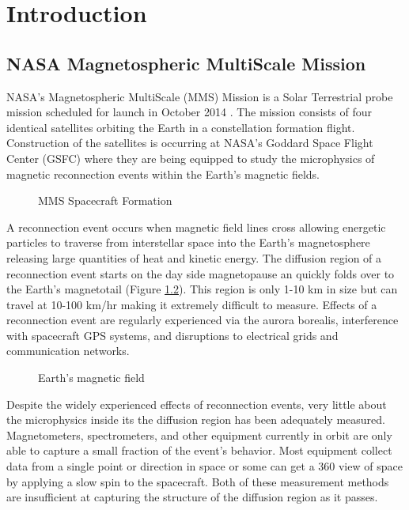 

\chapter{Introduction}
\label{chap:Introduction}

\section{NASA Magnetospheric MultiScale Mission}
\label{sec:NASAMagnetosphericMultiScaleMission}

NASA's Magnetospheric MultiScale (MMS) Mission is a Solar Terrestrial probe mission scheduled for launch in October 2014 \cite{mms_website}.  The mission consists of four identical satellites orbiting the Earth in a constellation formation flight.  Construction of the satellites is occurring at NASA's Goddard Space Flight Center (GSFC) where they are being equipped to study the microphysics of magnetic reconnection events within the Earth's magnetic fields.

\begin{figure}[H]
\centerline{}
\caption{MMS Spacecraft Formation}
\label{fig:spacecraft_formation}
\end{figure}

A reconnection event occurs when magnetic field lines cross allowing energetic particles to traverse from interstellar space into the Earth's magnetosphere releasing large quantities of heat and kinetic energy.  The diffusion region of a reconnection event starts on the day side magnetopause an quickly folds over to the Earth's magnetotail (Figure \ref{fig:magneticfields}).  This region is only 1-10 km in size but can travel at 10-100 km/hr \cite{swri} making it extremely difficult to measure.  Effects of a reconnection event are regularly experienced via the aurora borealis, interference with spacecraft GPS systems, and disruptions to electrical grids and communication networks.

\begin{figure}[H]
\centerline{}
\caption{Earth's magnetic field}
\label{fig:magneticfields}
\end{figure}

Despite the widely experienced effects of reconnection events, very little about the microphysics inside its the diffusion region has been adequately measured.  Magnetometers, spectrometers, and other equipment currently in orbit are only able to capture a small fraction of the event's behavior.  Most equipment collect data from a single point or direction in space or some can get a 360 view of space by applying a slow spin to the spacecraft.  Both of these measurement methods are insufficient at capturing the structure of the diffusion region as it passes.

